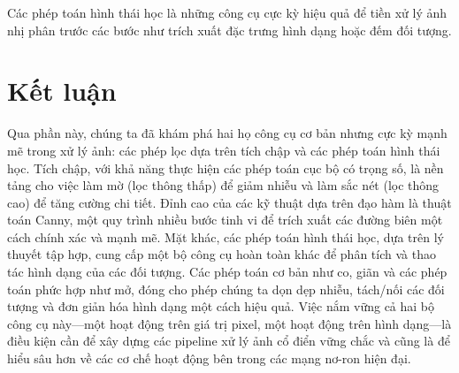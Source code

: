 Các phép toán hình thái học là những công cụ cực kỳ hiệu quả để tiền xử lý ảnh nhị phân trước các bước như trích xuất đặc trưng hình dạng hoặc đếm đối tượng.

\section*{Kết luận}
Qua phần này, chúng ta đã khám phá hai họ công cụ cơ bản nhưng cực kỳ mạnh mẽ trong xử lý ảnh: các phép lọc dựa trên tích chập và các phép toán hình thái học. Tích chập, với khả năng thực hiện các phép toán cục bộ có trọng số, là nền tảng cho việc làm mờ (lọc thông thấp) để giảm nhiễu và làm sắc nét (lọc thông cao) để tăng cường chi tiết. Đỉnh cao của các kỹ thuật dựa trên đạo hàm là thuật toán Canny, một quy trình nhiều bước tinh vi để trích xuất các đường biên một cách chính xác và mạnh mẽ. Mặt khác, các phép toán hình thái học, dựa trên lý thuyết tập hợp, cung cấp một bộ công cụ hoàn toàn khác để phân tích và thao tác hình dạng của các đối tượng. Các phép toán cơ bản như co, giãn và các phép toán phức hợp như mở, đóng cho phép chúng ta dọn dẹp nhiễu, tách/nối các đối tượng và đơn giản hóa hình dạng một cách hiệu quả.
Việc nắm vững cả hai bộ công cụ này—một hoạt động trên giá trị pixel, một hoạt động trên hình dạng—là điều kiện cần để xây dựng các pipeline xử lý ảnh cổ điển vững chắc và cũng là để hiểu sâu hơn về các cơ chế hoạt động bên trong các mạng nơ-ron hiện đại.

